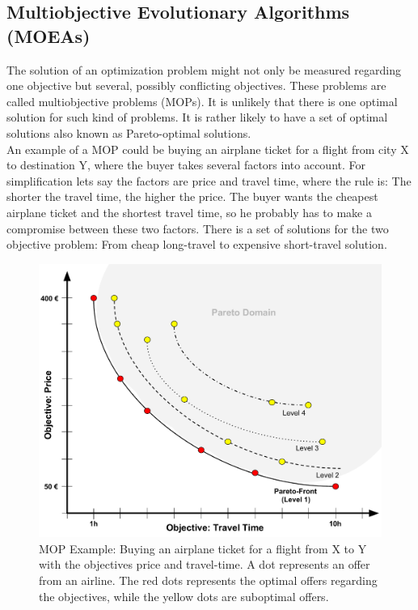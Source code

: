     \subsection{Multiobjective Evolutionary Algorithms (MOEAs)}
    The solution of an optimization problem might not only be measured regarding one objective but several, possibly conflicting objectives. These problems are called multiobjective problems (MOPs). It is unlikely that there is one optimal solution for such kind of problems. It is rather likely to have a set of optimal solutions also known as Pareto-optimal solutions.\\
    An example of a MOP could be buying an airplane ticket for a flight from city X to destination Y, where the buyer takes several factors into account. For simplification lets say the factors are price and travel time, where the rule is: The shorter the travel time, the higher the price. The buyer wants the cheapest airplane ticket and the shortest travel time, so he probably has to make a compromise between these two factors. There is a set of solutions for the two objective problem: From cheap long-travel to expensive short-travel solution.
    \begin{figure}
        \centering
        \includegraphics[scale=0.3]{./Figures/ParetoExample2}
        \caption{MOP Example: Buying an airplane ticket for a flight from X to Y with the objectives price and travel-time. A dot represents an offer from an airline. The red dots represents the optimal offers regarding the objectives, while the yellow dots are suboptimal offers.}
        \label{fig:paretoExample}
    \end{figure}
